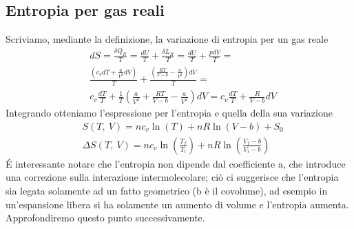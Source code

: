 \documentclass[
10pt, %
a4paper, %
oneside, %
headinclude,footinclude, %
BCOR5mm, %
]{scrartcl}
\begin{document}
\subsection{Entropia per gas reali}
Scriviamo, mediante la definizione, la variazione di entropia per un gas reale
\begin{align*}
	&dS = \frac{\delta Q_R}{T}=\frac{dU}{T}+\frac{\delta L_R}{T}=\frac{dU}{T}+\frac{pdV}{T}=\\
	&\frac{(c_v dT + \frac{a}{V^2}dV)}{T} + \frac{\left(\frac{RT}{V-b}-\frac{a}{V^2}\right)dV}{T}=\\
	&c_v \frac{dT}{T}+\frac{1}{T}\left(\frac{a}{V^2}+\frac{RT}{V-b}-\frac{a}{V^2}\right)dV = c_v \frac{dT}{T}+ \frac{R}{V-b}dV
\end{align*}
Integrando otteniamo l'espressione per l'entropia e quella della sua variazione
\begin{align*}
	&S(T,\ V) = n c_v \ln(T)+n R \ln(V-b)+S_0\\
	&\Delta S(T,\ V) = n c_v \ln\left(\frac{T_f}{T_i}\right)+n R \ln\left(\frac{V_f - b}{V_i - b}\right)
\end{align*}
\'{E} interessante notare che l'entropia non dipende dal coefficiente a, che introduce una correzione sulla interazione intermolecolare; ciò ci suggerisce che l'entropia sia legata solamente ad un fatto geometrico (b è il covolume), ad esempio in un'espansione libera si ha solamente un aumento di volume e l'entropia aumenta. Approfondiremo questo punto successivamente. 
\end{document}
